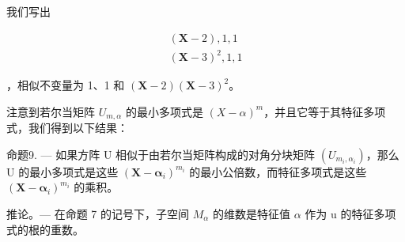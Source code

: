 我们写出

\[
\begin{array}{l} (\mathbf {X} - 2), 1, 1 \\ (\mathbf {X} - 3) ^ {2}, 1, 1 \end{array}
\]

，相似不变量为 1、1 和 \((\mathbf{X} - 2)(\mathbf{X} - 3)^2\)。

注意到若尔当矩阵 \(U_{m,\alpha}\) 的最小多项式是 \((X-\alpha)^{m}\)，并且它等于其特征多项式，我们得到以下结果：

命题9. --- 如果方阵 U 相似于由若尔当矩阵构成的对角分块矩阵 \((U_{m_{i},\alpha_{i}})\)，那么 U 的最小多项式是这些 \((\mathbf{X}-\boldsymbol{\alpha}_{i})^{m_{i}}\) 的最小公倍数，而特征多项式是这些 \((\mathbf{X}-\boldsymbol{\alpha}_{i})^{m_{i}}\) 的乘积。

推论。--- 在命题 7 的记号下，子空间 \(M_{\alpha}\) 的维数是特征值 \(\alpha\) 作为 u 的特征多项式的根的重数。

